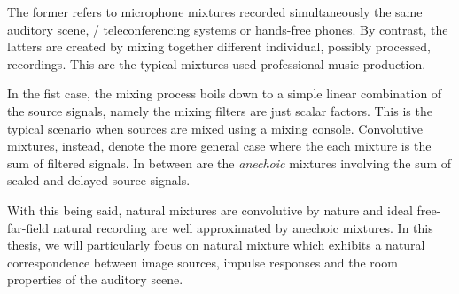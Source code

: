 The former refers to microphone mixtures recorded simultaneously the same auditory scene, \eg/ teleconferencing systems or hands-free phones.
By contrast, the latters are created by mixing together different individual, possibly processed, recordings.
This are the typical mixtures used professional music production.

In the fist case, the mixing process boils down to a simple linear combination of the source signals, namely
the mixing filters are just scalar factors.
This is the typical scenario when sources are mixed using a mixing console.
Convolutive mixtures, instead, denote the more general case where the each mixture is the sum of filtered signals.
In between are the \textit{anechoic} mixtures involving the sum of scaled and delayed source signals.

With this being said, natural mixtures are convolutive by nature and ideal free-far-field natural recording are well approximated by anechoic mixtures.
In this thesis, we will particularly focus on natural mixture which exhibits a natural correspondence between image sources, impulse responses and the
room properties of the auditory scene.


